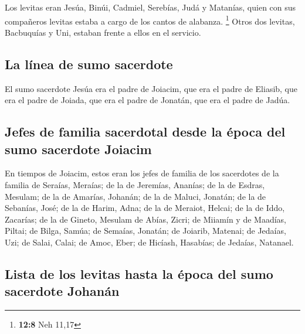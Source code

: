  Los levitas eran Jesúa, Binúi, Cadmiel, Serebías, Judá y
Matanías, quien con sus compañeros levitas estaba a cargo de los cantos
de alabanza. \footnote{\textbf{12:8} Neh 11,17}  Otros dos
levitas, Bacbuquías y Uni, estaban frente a ellos en el servicio.

\hypertarget{la-luxednea-de-sumo-sacerdote}{%
\subsection{La línea de sumo
sacerdote}\label{la-luxednea-de-sumo-sacerdote}}

 El sumo sacerdote Jesúa era el padre de Joiacim, que era
el padre de Eliasib, que era el padre de Joiada,  que era
el padre de Jonatán, que era el padre de Jadúa.

\hypertarget{jefes-de-familia-sacerdotal-desde-la-uxe9poca-del-sumo-sacerdote-joiacim}{%
\subsection{Jefes de familia sacerdotal desde la época del sumo
sacerdote
Joiacim}\label{jefes-de-familia-sacerdotal-desde-la-uxe9poca-del-sumo-sacerdote-joiacim}}

 En tiempos de Joiacim, estos eran los jefes de familia
de los sacerdotes de la familia de Seraías, Meraías; de la de Jeremías,
Ananías;  de la de Esdras, Mesulam; de la de Amarías,
Johanán;  de la de Maluci, Jonatán; de la de Sebanías,
José;  de la de Harim, Adna; de la de Meraiot, Helcai;
 de la de Iddo, Zacarías; de la de Gineto, Mesulam
 de Abías, Zicri; de Miiamín y de Maadías, Piltai;
 de Bilga, Samúa; de Semaías, Jonatán;  de
Joiarib, Matenai; de Jedaías, Uzi;  de Salai, Calai; de
Amoc, Eber;  de Hicíash, Hasabías; de Jedaías, Natanael.

\hypertarget{lista-de-los-levitas-hasta-la-uxe9poca-del-sumo-sacerdote-johanuxe1n}{%
\subsection{Lista de los levitas hasta la época del sumo sacerdote
Johanán}\label{lista-de-los-levitas-hasta-la-uxe9poca-del-sumo-sacerdote-johanuxe1n}}

